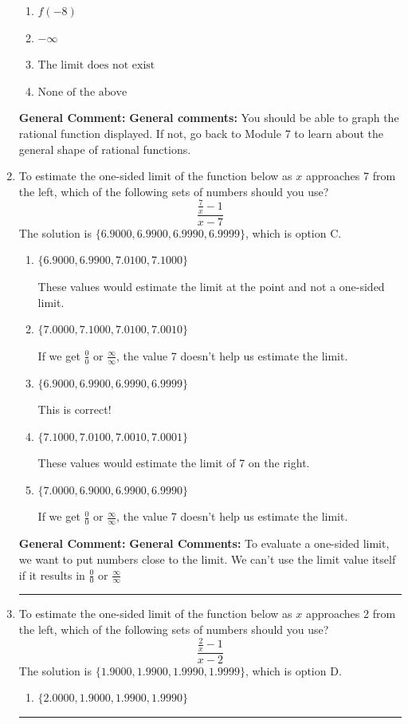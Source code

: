 \documentclass{extbook}[14pt]
\newcommand{\litem}[1]{\item #1

\rule{\textwidth}{0.4pt}}
\begin{document}
\begin{enumerate}
{\begin{enumerate}[label=\Alph*.]
\item \( f(-8) \)


\item \( -\infty \)


\item \( \text{The limit does not exist} \)


\item \( \text{None of the above} \)


\end{enumerate}

\textbf{General Comment:} \textbf{General comments:} You should be able to graph the rational function displayed. If not, go back to Module 7 to learn about the general shape of rational functions.
}
\litem{
To estimate the one-sided limit of the function below as $x$ approaches 7 from the left, which of the following sets of numbers should you use?
\[ \frac{\frac{7}{x} - 1}{x - 7} \]The solution is \( \{ 6.9000, 6.9900, 6.9990, 6.9999 \} \), which is option C.\begin{enumerate}[label=\Alph*.]
\item \( \{ 6.9000, 6.9900, 7.0100, 7.1000 \} \)

These values would estimate the limit at the point and not a one-sided limit.
\item \( \{ 7.0000, 7.1000, 7.0100, 7.0010 \} \)

If we get $\frac{0}{0}$ or $\frac{\infty}{\infty}$, the value 7 doesn't help us estimate the limit.
\item \( \{ 6.9000, 6.9900, 6.9990, 6.9999 \} \)

This is correct!
\item \( \{ 7.1000, 7.0100, 7.0010, 7.0001 \} \)

These values would estimate the limit of 7 on the right.
\item \( \{ 7.0000, 6.9000, 6.9900, 6.9990 \} \)

If we get $\frac{0}{0}$ or $\frac{\infty}{\infty}$, the value 7 doesn't help us estimate the limit.
\end{enumerate}

\textbf{General Comment:} \textbf{General Comments:} To evaluate a one-sided limit, we want to put numbers close to the limit. We can't use the limit value itself if it results in $\frac{0}{0}$ or $\frac{\infty}{\infty}$
}
\litem{
To estimate the one-sided limit of the function below as $x$ approaches 2 from the left, which of the following sets of numbers should you use?
\[ \frac{\frac{2}{x} - 1}{x - 2} \]The solution is \( \{ 1.9000, 1.9900, 1.9990, 1.9999 \} \), which is option D.\begin{enumerate}[label=\Alph*.]
\item \( \{ 2.0000, 1.9000, 1.9900, 1.9990 \} \)


\end{enumerate}}
\end{enumerate}
\end{document}
